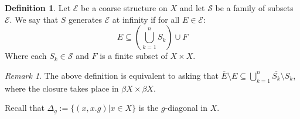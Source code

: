 \documentclass[11pt]{amsart}
\theoremstyle{plain}
\theoremstyle{definition}%
\newtheorem{definition}[theorem]{Definition}%
\theoremstyle{remark}%
\newtheorem{remark}[theorem]{Remark}%
\begin{document}
\begin{definition}
Let $\mathcal{E}$ be a coarse structure on $X$ and let $\mathcal{S}$ be a family of subsets $\mathcal{E}$. We say that $S$ generates $\mathcal{E}$ at infinity if for all $E \in \mathcal{E}$: 
\begin{equation*}
E \subseteq (\bigcup_{k=1}^{n}S_{k})\cup F
\end{equation*}
Where each $S_{k} \in \mathcal{S}$ and $F$ is a finite subset of $X \times X$.
\end{definition}

\begin{remark}
The above definition is equivalent to asking that $\overline{E}\setminus E \subseteq \bigcup_{k=1}^{n}\overline{S_{k}}\setminus S_{k}$, where the closure takes place in $\beta X \times \beta X$.
\end{remark}

Recall that $\Delta_{g}:= \lbrace (x,x.g)|x \in X \rbrace$ is the $g$-diagonal in $X$.
\end{document}
